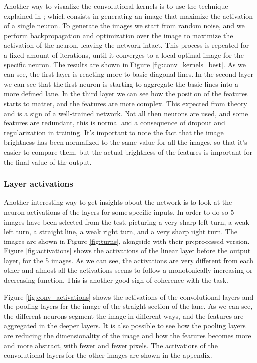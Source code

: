 \documentclass[a4paper,12pt,sort&compress]{article}
\begin{document}
    Another way to visualize the convolutional kernels is to use the technique explained in
    \citep*{uozbulak_pytorch_vis_2022}; which consists in generating an image that maximize the
    activation of a single neuron. To generate the images we start from random noise, and we perform
    backpropagation and optimization over the image to maximize the activation of the neuron,
    leaving the network intact. This process is repeated for a fixed amount of iterations, until it
    converges to a local optimal image for the specific neuron. The
    results are shown in Figure \ref{fig:conv_kernels_best}. As we can see, the first layer is
    reacting more to basic diagonal lines. In the second layer we can see that the first neuron is
    starting to aggregate the basic lines into a more defined lane. In the third layer we can see
    how the position of the features starts to matter, and the features are more complex. This
    expected from theory and is a sign of a well-trained network. Not all then neurons are used, and
    some features are redundant, this is normal and a consequence of dropout and regularization in training.
    It's important to note the
    fact that the image brightness has been normalized to the same value for all the images, so that
    it's easier to compare them, but the actual brightness of the features is important for the
    final value of the output. 

\subsubsection*{Layer activations}
    Another interesting way to get insights about the network is to look at the neuron activations of the
    layers for some specific inputs. In order to do so 5 images have been selected from the test,
    picturing a very sharp left turn, a weak left turn, a straight line, a weak right turn, and a
    very sharp right turn. The images are shown in Figure \ref{fig:turns}, alongside with their
    preprocessed version. Figure \ref{fig:activations} shows the activations of the linear layer
    before the output layer, for the 5 images. As we can see, the activations are very different
    from each other and almost all the activations seems to follow a monotonically increasing or
    decreasing function. This is another good sign of coherence with the task.

    Figure \ref{fig:conv_activations} shows the activations of the convolutional layers and the
    pooling layers for the image of the straight section of the lane. As we can see, the different
    neurons segment the image in different ways, and the features are aggregated in the deeper
    layers. It is also possible to see how the pooling layers are reducing the dimensionality of the
    image and how the features becomes more and more abstract, with fewer and fewer pixels. The
    activations of the convolutional layers for the other images are shown in the appendix.
\end{document}
